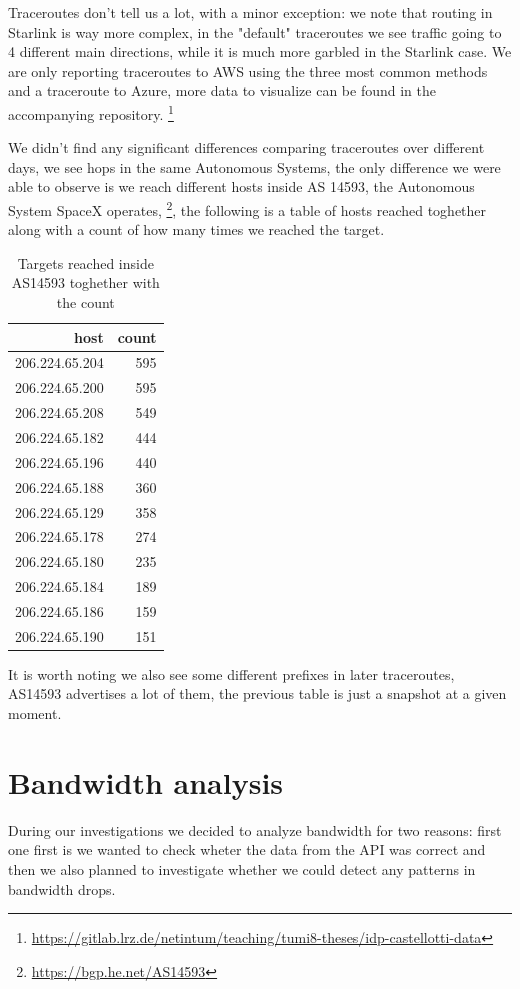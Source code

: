 \documentclass[IN,11pt,twoside,openright,bachelor,english]{tumthesis}
\begin{document}
Traceroutes don't tell us a lot, with a minor exception: we note that routing in Starlink is way more complex, in the "default" traceroutes we see traffic going to 4 different main directions, while it is much more garbled in the Starlink case. We are only reporting traceroutes to AWS using the three most common methods and a traceroute to Azure, more data to visualize can be found in the accompanying repository. \footnote{\url{https://gitlab.lrz.de/netintum/teaching/tumi8-theses/idp-castellotti-data}}

We didn't find any significant differences comparing traceroutes over different days, we see hops in the same Autonomous Systems, the only difference we were able to observe is we reach different hosts inside AS 14593, the Autonomous System SpaceX operates, \footnote{\url{https://bgp.he.net/AS14593}}, the following is a table of hosts reached toghether along with a count of how many times we reached the target.

\begin{table}[]
	\centering
	\begin{tabular}{ r r }
		\toprule
		host           & count \\ 
		\midrule
		206.224.65.204 & 595   \\
		206.224.65.200 & 595   \\
		206.224.65.208 & 549   \\ 
		206.224.65.182 & 444   \\
		206.224.65.196 & 440   \\ 
		206.224.65.188 & 360   \\ 
		206.224.65.129 & 358   \\ 
		206.224.65.178 & 274   \\ 
		206.224.65.180 & 235   \\ 
		206.224.65.184 & 189   \\ 
		206.224.65.186 & 159   \\ 
		206.224.65.190 & 151   \\
		\bottomrule
	\end{tabular}
	\caption{Targets reached inside AS14593 toghether with the count}
	\end{table}

It is worth noting we also see some different prefixes in later traceroutes, AS14593 advertises a lot of them, the previous table is just a snapshot at a given moment.


\section{Bandwidth analysis}
\label{sec:bw}
During our investigations we decided to analyze bandwidth for two reasons: first one first is we wanted to check wheter the data from the API was correct and then we also planned to investigate whether we could detect any patterns in bandwidth drops.
\end{document}
